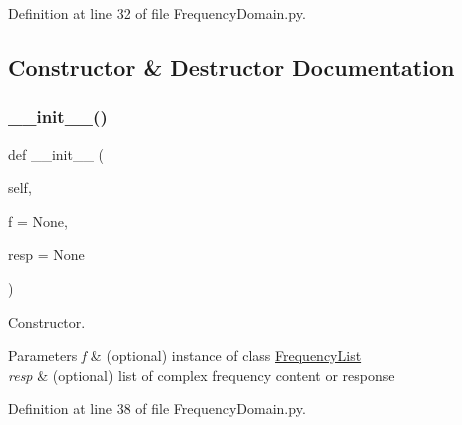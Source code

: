 Definition at line 32 of file Frequency\+Domain.\+py.



\subsection{Constructor \& Destructor Documentation}
\mbox{\label{classSignalIntegrity_1_1FrequencyDomain_1_1FrequencyDomain_1_1FrequencyDomain_af89c1b84b55a8388acf19c91be67a97e}} 
\subsubsection{\texorpdfstring{\+\_\+\+\_\+init\+\_\+\+\_\+()}{\_\_init\_\_()}}
{\footnotesize\ttfamily def \+\_\+\+\_\+init\+\_\+\+\_\+ (\begin{DoxyParamCaption}\item[{}]{self,  }\item[{}]{f = {\ttfamily None},  }\item[{}]{resp = {\ttfamily None} }\end{DoxyParamCaption})}



Constructor. 


\begin{DoxyParams}{Parameters}
{\em f} & (optional) instance of class \hyperlink{namespaceSignalIntegrity_1_1FrequencyDomain_1_1FrequencyList}{Frequency\+List} \\
\hline
{\em resp} & (optional) list of complex frequency content or response \\
\hline
\end{DoxyParams}


Definition at line 38 of file Frequency\+Domain.\+py.



